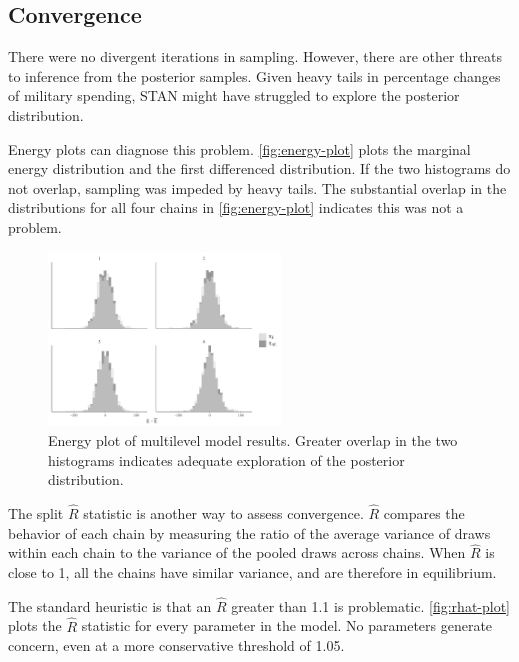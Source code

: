 \documentclass[12pt]{article}
\begin{document}
\subsection{Convergence} 


There were no divergent iterations in sampling. 
However, there are other threats to inference from the posterior samples. 
Given heavy tails in percentage changes of military spending, STAN might have struggled to explore the posterior distribution. 


Energy plots can diagnose this problem. 
\autoref{fig:energy-plot} plots the marginal energy distribution and the first differenced distribution. 
If the two histograms do not overlap, sampling was impeded by heavy tails. 
The substantial overlap in the distributions for all four chains in \autoref{fig:energy-plot} indicates this was not a problem. 


\begin{figure}
	\centering
		\includegraphics[width=0.55\textwidth]{energy-plot.png}
	\caption{Energy plot of multilevel model results. Greater overlap in the two histograms indicates adequate exploration of the posterior distribution. }
	\label{fig:energy-plot}
\end{figure}


The split $\hat{R}$ statistic is another way to assess convergence. 
$\hat{R}$ compares the behavior of each chain by measuring the ratio of the average variance of draws within each chain to the variance of the pooled draws across chains. 
When $\hat{R}$ is close to 1, all the chains have similar variance, and are therefore in equilibrium. 


The standard heuristic is that an $\hat{R}$ greater than 1.1 is problematic. 
\autoref{fig:rhat-plot} plots the $\hat{R}$ statistic for every parameter in the model. 
No parameters generate concern, even at a more conservative threshold of 1.05. 
\end{document}
